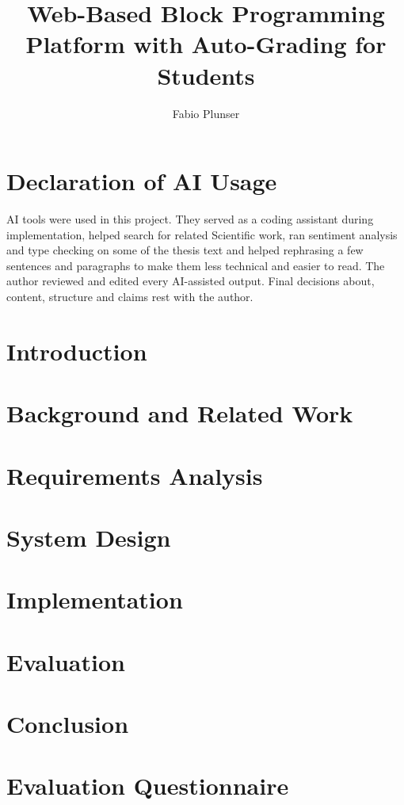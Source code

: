 \documentclass[bachelor]{qethesis}
\title[BlockQuiz]{Web-Based Block Programming Platform
with Auto-Grading for Students}
\author{Fabio Plunser}
\begin{document}
\maketitle





\tableofcontents
\listoffigures
\listoftables
\lstlistoflistings
\uibkdeclaration
\label{chap:declare}

\chapter*{Declaration of AI Usage}
\label{chap:ai-usage}
AI tools were used in this project.
They served as a coding assistant during implementation, helped search for related
Scientific work, ran sentiment analysis and type checking on some of the thesis text and helped
rephrasing a few sentences and paragraphs to make them less technical and easier to read.
The author reviewed and edited every AI-assisted output.
Final decisions about, content, structure and claims rest with the author.


\mainmatter
\pagestyle{headings}


\chapter{Introduction}
\label{chap:introduction}


\chapter{Background and Related Work}
\label{chap:background}


\chapter{Requirements Analysis}
\label{chap:requirements}


\chapter{System Design}
\label{chap:design}


\chapter{Implementation}
\label{chap:implementation}


\chapter{Evaluation}
\label{chap:evaluation}


\chapter{Conclusion}
\label{chap:conclusion}





\chapter{Evaluation Questionnaire}
\label{app:questionnaire}

\end{document}
